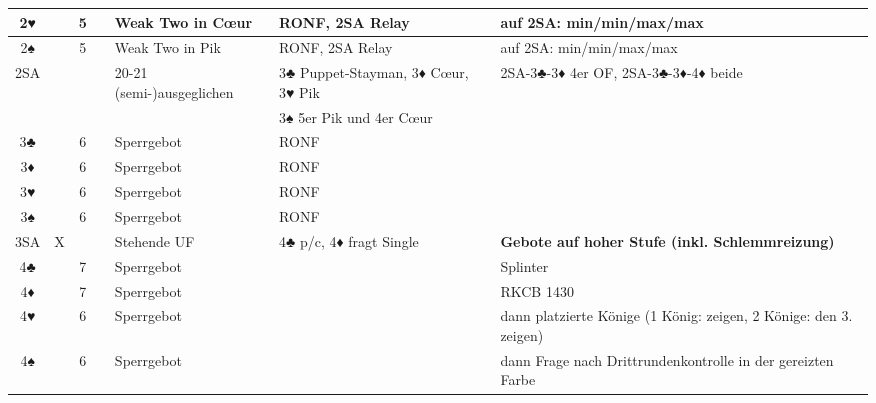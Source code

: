 \documentclass{article}
\begin{document}
\begin{tabularx}{\columnwidth}{|c|c|c|c|l|l|X|l|}
\hline 2♥  & &5& & Weak Two in Cœur & RONF, 2SA Relay & auf 2SA: min/min/max/max & \\
\hline 2♠  & &5& & Weak Two in Pik  & RONF, 2SA Relay & auf 2SA: min/min/max/max & \\
\hline 2SA & & & & 20-21 (semi-)ausgeglichen & 3♣ Puppet-Stayman, 3♦ Cœur, 3♥ Pik  & 2SA-3♣-3♦ 4er OF, 2SA-3♣-3♦-4♦ beide & \\
           & & & & & 3♠ 5er Pik und 4er Cœur & & \\
\hline 3♣  & &6& & Sperrgebot & RONF & & \\
\hline 3♦  & &6& & Sperrgebot & RONF & & \\
\hline 3♥  & &6& & Sperrgebot & RONF & & \\
\hline 3♠  & &6& & Sperrgebot & RONF & & \\
\hline 3SA &X& & & Stehende UF & 4♣ p/c, 4♦ fragt Single & \multicolumn{2}{l|}{\bf Gebote auf hoher Stufe (inkl. Schlemmreizung)} \\
\hline 4♣  & &7& & Sperrgebot & & \multicolumn{2}{l|}{Splinter} \\
\hline 4♦  & &7& & Sperrgebot & & \multicolumn{2}{l|}{RKCB 1430} \\
\hline 4♥  & &6& & Sperrgebot & & \multicolumn{2}{l|}{dann platzierte Könige (1 König: zeigen, 2 Könige: den 3. zeigen)} \\
\hline 4♠  & &6& & Sperrgebot & & \multicolumn{2}{l|}{dann Frage nach Drittrundenkontrolle in der gereizten Farbe} \\
\hline \end{tabularx}
\end{document}
